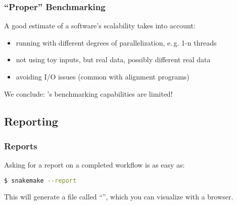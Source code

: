 \begin{frame}
  \frametitle{``Proper'' Benchmarking}
  A good estimate of a software's scalability takes into account:
  \begin{itemize}[<+->]
   \item running with different degrees of parallelization, e.\,g. 1-n threads
   \item not using toy inputs, but real data, possibly different real data
   \item avoiding I/O issues (common with alignment programs)
  \end{itemize}
  \pause
  \begin{warning}
  	We conclude: \Snakemake{}'s benchmarking capabilities are limited!
  \end{warning}
\end{frame}

\subsection{Reporting}

\begin{frame}[fragile]
  \frametitle{\Snakemake{} Reports}
  Asking \Snakemake{} for a report on a completed workflow is as easy as:
  \begin{lstlisting}[language=Bash, style=Shell]
$ snakemake --report
  \end{lstlisting}
  This will generate a file called ``'', which you can visualize with a browser.
\end{frame} 



